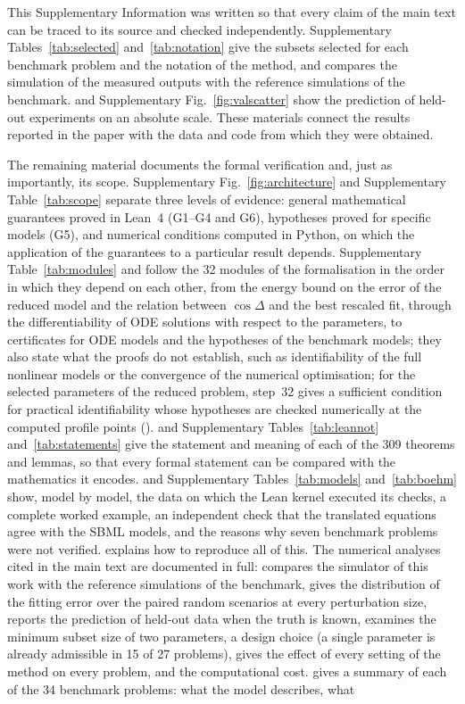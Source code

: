 
This Supplementary Information was written so that every claim of the main text can be traced to its source and checked independently. Supplementary Tables~\ref{tab:selected} and~\ref{tab:notation} give the subsets selected for each benchmark problem and the notation of the method, and  compares the simulation of the measured outputs with the reference simulations of the benchmark.  and Supplementary Fig.~\ref{fig:valscatter} show the prediction of held-out experiments on an absolute scale. These materials connect the results reported in the paper with the data and code from which they were obtained.

The remaining material documents the formal verification and, just as importantly, its scope. Supplementary Fig.~\ref{fig:architecture} and Supplementary Table~\ref{tab:scope} separate three levels of evidence: general mathematical guarantees proved in Lean~4 (G1--G4 and G6), hypotheses proved for specific models (G5), and numerical conditions computed in Python, on which the application of the guarantees to a particular result depends. Supplementary Table~\ref{tab:modules} and  follow the 32 modules of the formalisation in the order in which they depend on each other, from the energy bound on the error of the reduced model and the relation between $\cos\Delta$ and the best rescaled fit, through the differentiability of ODE solutions with respect to the parameters, to certificates for ODE models and the hypotheses of the benchmark models; they also state what the proofs do not establish, such as identifiability of the full nonlinear models or the convergence of the numerical optimisation; for the selected parameters of the reduced problem, step~32 gives a sufficient condition for practical identifiability whose hypotheses are checked numerically at the computed profile points ().  and Supplementary Tables~\ref{tab:leannot} and~\ref{tab:statements} give the statement and meaning of each of the 309 theorems and lemmas, so that every formal statement can be compared with the mathematics it encodes.  and Supplementary Tables~\ref{tab:models} and~\ref{tab:boehm} show, model by model, the data on which the Lean kernel executed its checks, a complete worked example, an independent check that the translated equations agree with the SBML models, and the reasons why seven benchmark problems were not verified.  explains how to reproduce all of this. The numerical analyses cited in the main text are documented in full:  compares the simulator of this work with the reference simulations of the benchmark,  gives the distribution of the fitting error over the paired random scenarios at every perturbation size,  reports the prediction of held-out data when the truth is known,  examines the minimum subset size of two parameters, a design choice (a single parameter is already admissible in 15 of 27 problems),  gives the effect of every setting of the method on every problem, and  the computational cost.  gives a summary of each of the 34 benchmark problems: what the model describes, what 